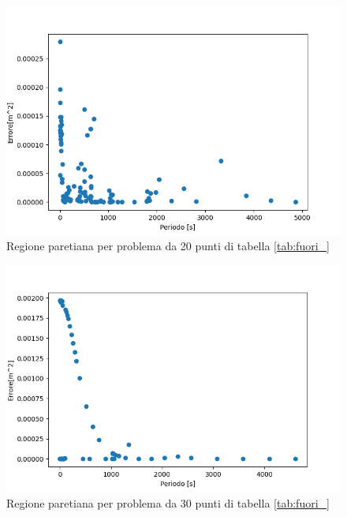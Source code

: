 \documentclass[a4paper,12pt]{report}
\begin{document}
\begin{itemize}
  \begin{figure}[H]
    \centering
    \includegraphics[scale=0.70]{img/puls0010/puntoUtopia20.png}
    \caption{Regione paretiana per problema da 20 punti di tabella \ref{tab:fuori_}}
    \label{fig:reg_ammis_20_0010}
  \end{figure}

  \begin{figure}[H]
    \centering
    \includegraphics[scale=0.70]{img/puls0010/puntoUtopia30.png}
    \caption{Regione paretiana per problema da 30 punti di tabella \ref{tab:fuori_}}
    \label{fig:reg_ammis_30_0010}
  \end{figure}


\end{itemize}
\end{document}
